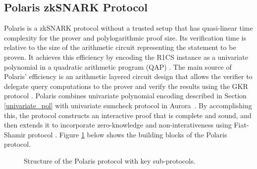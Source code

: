 \subsection{Polaris zkSNARK Protocol} \label{sec:prel_polaris}


Polaris \cite{Polaris} is a zkSNARK protocol without a trusted setup that has quasi-linear time complexity for the prover and polylogarithmic proof size. Its verification time is relative to the size of the arithmetic circuit representing the statement to be proven. It achieves this efficiency by encoding the R1CS instance as a univariate polynomial in a quadratic arithmetic program (QAP) \cite{GGPR13}. The main source of Polaris' efficiency is an arithmetic layered circuit design that allows the verifier to delegate query computations to the prover and verify the results using the GKR protocol \cite{GKR2008}. 
Polaris combines univariate polynomial encoding described in Section \ref{univariate_pol} with univariate sumcheck protocol in Aurora~\cite{Aurora2019}.
By accomplishing this, the protocol constructs an interactive proof that is complete and sound, and then extends it to incorporate zero-knowledge and non-interativeness using Fiat-Shamir protocol \cite{Fiat1987}. Figure \ref{fig:polaris-blocks} below shows the building blocks of the Polaris protocol.

\begin{figure}[h]
	\centering
	
	\caption{
		Structure of the Polaris protocol with key sub-protocols. }
	\label{fig:polaris-blocks}
\end{figure}


